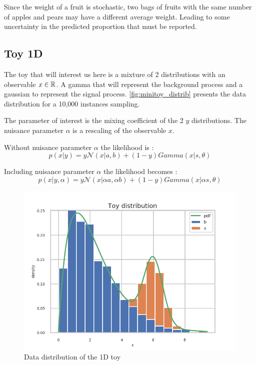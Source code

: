 Since the weight of a fruit is stochastic, two bags of fruits with the same number of apples and pears may have a different average weight.
Leading to some uncertainty in the predicted proportion that must be reported.






\subsection{Toy 1D} %
\label{sub:toy_1d}

The toy that will interest us here is a mixture of 2 distributions with an observable $x \in \mathbb{R}$.
A gamma that will represent the background process and a gaussian to represent the signal process.
\autoref{fig:minitoy_distrib} presents the data distribution for a 10,000 instances sampling.

The parameter of interest is the mixing coefficient of the 2 $y$ distributions.
The nuisance parameter $\alpha$ is a rescaling of the observable $x$.

Without nuisance parameter $\alpha$ the likelihood is :
$$
    p(x | y) = y \mathcal N(x|a, b) + (1-y) Gamma(x|s, \theta)
$$

Including nuisance parameter $\alpha$ the likelihood becomes :
$$
    p(x | y, \alpha) = y \mathcal N(x|\alpha a, \alpha b) + (1-y) Gamma(x|\alpha s, \theta)
$$

\begin{figure}[htb]
    \includegraphics[width=\linewidth]{minitoy/distrib.png}
    \caption{Data distribution of the 1D toy}
    \label{fig:minitoy_distrib}
\end{figure}




